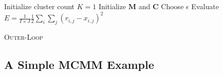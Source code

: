 {\begin{algorithm}[h]
Initialize cluster count $K = 1$\;
Initialize $\textbf{M}$ and $\textbf{C}$\;
Choose $\epsilon$\;
Evaluate $E = \frac{1}{I\times J} \frac{1}{2} \sum_i \sum_j (r_{i,j} - x_{i,j})^2$\;\label{line:init-E}
\caption{\textsc{Outer-Loop}}
\label{alg:outer-loop}
\end{algorithm}

  

\subsection{A Simple MCMM Example}
\label{subsec:example}

}

